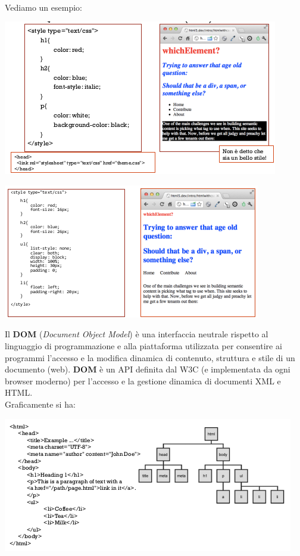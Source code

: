 \documentclass[a4paper,12pt, oneside]{book}
\begin{document}
\\Vediamo un esempio:
\begin{center}
\includegraphics[scale=0.9]{img/css.png}
\end{center}
\begin{center}
\includegraphics[scale=0.9]{img/css2.png}
\end{center}
Il \textbf{DOM} (\textit{Document Object Model}) è una interfaccia neutrale rispetto al linguaggio di programmazione e alla piattaforma utilizzata per consentire ai programmi l'accesso e la modifica dinamica di contenuto, struttura e stile di un documento (web). \textbf{DOM} è un API definita dal W3C (e implementata da ogni browser moderno) per l'accesso e la gestione dinamica di documenti XML e HTML.\\
Graficamente si ha:
\begin{center}
\includegraphics[scale=0.9]{img/dom.png}
\end{center}
\end{document}
